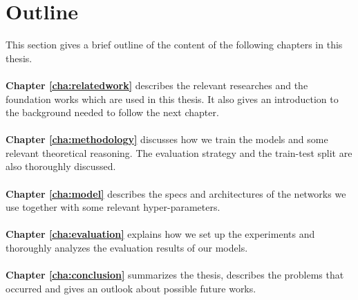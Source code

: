 \section{Outline\label{sec:outline}}

This section gives a brief outline of the content of the following chapters in this
thesis.
\\
\\
\textbf{Chapter \ref{cha:relatedwork}} describes the relevant researches and the
foundation works which are used in this thesis. It also gives an introduction to the
background needed to follow the next chapter.
\\
\\
\textbf{Chapter \ref{cha:methodology}} discusses how we train the models and some relevant
theoretical reasoning. The evaluation strategy and the train-test split are also
thoroughly discussed.
\\
\\
\textbf{Chapter \ref{cha:model}} describes the specs and architectures of the networks we
use together with some relevant hyper-parameters.
\\
\\
\textbf{Chapter \ref{cha:evaluation}} explains how we set up the experiments and
thoroughly analyzes  the evaluation results of our models.
\\
\\
\textbf{Chapter \ref{cha:conclusion}} summarizes the thesis, describes the problems that
occurred and gives an outlook about possible future works.
